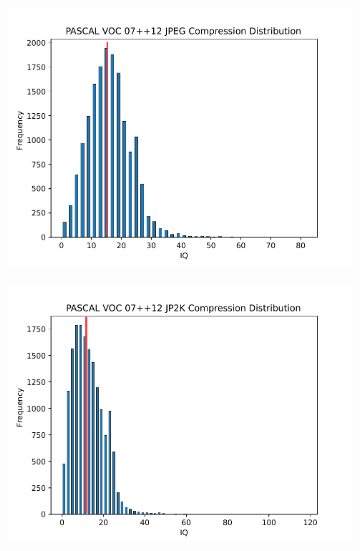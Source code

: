 \begin{figure}[H]
\begin{subfigure}[b]{0.4\textwidth}
        \includegraphics[width=\textwidth]{Figs/Implementation/JPEGCompressiondistred.pdf}
        \caption{}\label{fig:dist_jp}
    \end{subfigure}
    \begin{subfigure}[b]{0.4\textwidth}
        \center
        \includegraphics[width=\textwidth]{Figs/Implementation/JP2KCompressiondistred.pdf}
        \caption{}\label{fig:dist_jk}
    \end{subfigure}
  	\begin{subfigure}[b]{0.4\textwidth}
        \center

\end{subfigure}
\end{figure}
